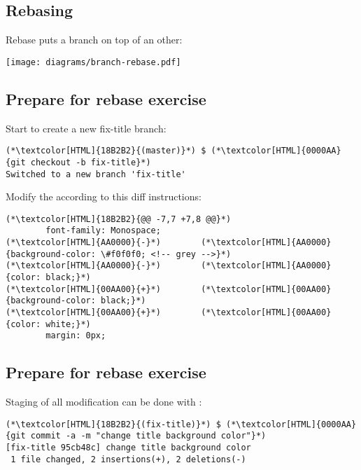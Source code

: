 \subsection{Rebasing}
\begin{frame}[fragile]
  \subslidetitle
  Rebase puts a branch on top of an other:
  \centerline{\texttt{[image: diagrams/branch-rebase.pdf]}}
\end{frame}

\subsection{Prepare for rebase exercise}
\begin{frame}[fragile]
  \subslidetitle

  Start to create a new fix-title branch:
  \begin{lstlisting}
(*\textcolor[HTML]{18B2B2}{(master)}*) $ (*\textcolor[HTML]{0000AA}{git checkout -b fix-title}*)
Switched to a new branch 'fix-title'
\end{lstlisting}

  Modify the  according to this diff instructions:
  \begin{lstlisting}
(*\textcolor[HTML]{18B2B2}{@@ -7,7 +7,8 @@}*)
        font-family: Monospace;
(*\textcolor[HTML]{AA0000}{-}*)        (*\textcolor[HTML]{AA0000}{background-color: \#f0f0f0; <!-- grey -->}*)
(*\textcolor[HTML]{AA0000}{-}*)        (*\textcolor[HTML]{AA0000}{color: black;}*)
(*\textcolor[HTML]{00AA00}{+}*)        (*\textcolor[HTML]{00AA00}{background-color: black;}*)
(*\textcolor[HTML]{00AA00}{+}*)        (*\textcolor[HTML]{00AA00}{color: white;}*)
        margin: 0px;
\end{lstlisting}
\end{frame}

\subsection{Prepare for rebase exercise}
\begin{frame}[fragile]
  \subslidetitle
  Staging of all modification can be done with :
  \begin{lstlisting}
(*\textcolor[HTML]{18B2B2}{(fix-title)}*) $ (*\textcolor[HTML]{0000AA}{git commit -a -m "change title background color"}*)
[fix-title 95cb48c] change title background color
 1 file changed, 2 insertions(+), 2 deletions(-)
\end{lstlisting}

\end{frame}

